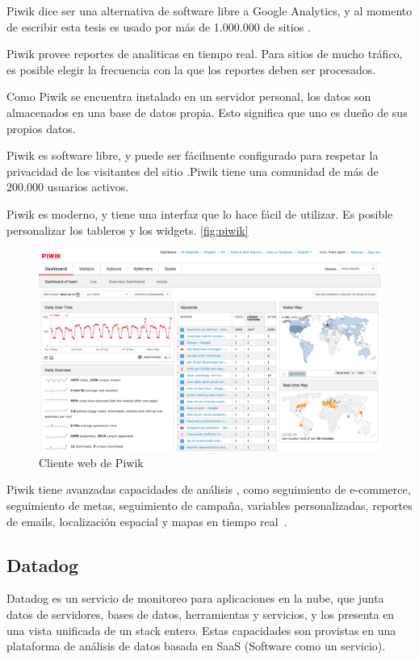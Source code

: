 Piwik dice ser una alternativa de software libre a Google Analytics, y al
momento de escribir esta tesis es usado por más de 1.000.000 de sitios .

Piwik provee reportes de analiticas  en tiempo real. Para sitios  de
mucho tráfico, es posible elegir la frecuencia con la que los reportes deben
ser procesados.

Como Piwik se encuentra instalado en un servidor personal, los datos son
almacenados en una base de datos propia. Esto significa que uno es dueño de sus
propios datos.

Piwik es software libre, y puede ser fácilmente configurado para respetar la
privacidad de los visitantes del sitio .Piwik tiene una comunidad de más de
200.000 usuarios activos.

Piwik es moderno, y tiene una interfaz que lo hace fácil de utilizar. Es
posible personalizar los tableros y los widgets. \autoref{fig:piwik}

\begin{figure}
  \includegraphics[width=\linewidth]{src/images/anexos/piwik.png}
  \caption{Cliente web de Piwik}
  \label{fig:piwik}
\end{figure}

Piwik tiene avanzadas capacidades de análisis , como seguimiento de
e-commerce, seguimiento de metas, seguimiento de campaña, variables
personalizadas, reportes de emails, localización espacial y mapas en tiempo
real~\cite{piwik}.

\subsection{Datadog}

Datadog es un servicio de monitoreo para aplicaciones en la nube, que junta
datos de servidores, bases de datos, herramientas y servicios, y los presenta
en una vista unificada de un stack entero. Estas capacidades son provistas en
una plataforma de análisis de datos  basada en SaaS (Software como un
servicio).

